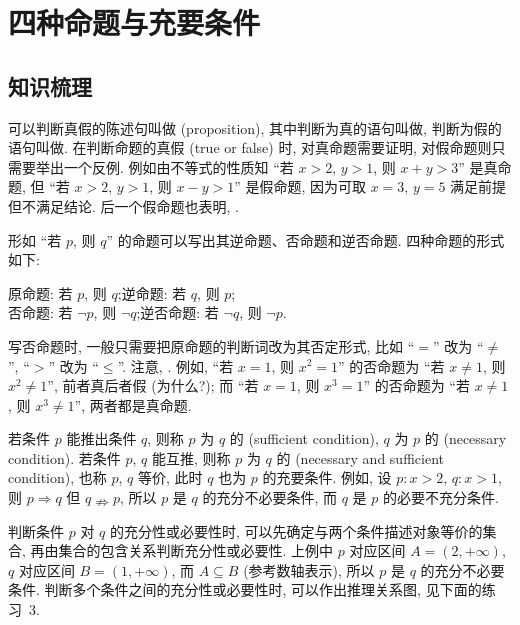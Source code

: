   \section{四种命题与充要条件}

  \subsection{知识梳理}
  可以判断真假的陈述句叫做 (proposition), 
  其中判断为真的语句叫做, 判断为假的语句叫做.
  在判断命题的真假 (true or false) 时, 对真命题需要证明, 对假命题则只需要举出一个反例. 
  例如由不等式的性质知 ``若 $x>2$, $y>1$, 则 $x+y>3$'' 是真命题, 
  但 ``若 $x>2$, $y>1$, 则 $x-y>1$'' 是假命题, 
  因为可取 $x=3$, $y=5$ 满足前提但不满足结论. 后一个假命题也表明, .
  
  形如 ``若 $p$, 则 $q$'' 的命题可以写出其逆命题、否命题和逆否命题. 四种命题的形式如下:
  \begin{center}
    原命题: 若 $p$, 则 $q$;\quad 逆命题: 若 $q$, 则 $p$;\\
    否命题: 若 $\neg p$, 则 $\neg q$;\quad 逆否命题: 若 $\neg q$, 则 $\neg p$.
  \end{center}
  写否命题时, 一般只需要把原命题的判断词改为其否定形式, 比如 ``$=$'' 改为 ``$\neq$'', ``$>$'' 改为 ``$\leqslant$''.   注意, .
  例如, ``若 $x=1$, 则 $x^2=1$'' 的否命题为 ``若 $x\neq 1$, 则 $x^2\neq 1$'', 前者真后者假 (为什么?); 而 ``若 $x=1$, 则 $x^3=1$'' 的否命题为 ``若 $x\neq 1$, 则 $x^3\neq 1$'', 两者都是真命题. 

  
  若条件 $p$ 能推出条件 $q$, 则称 $p$ 为 $q$ 的 
  (sufficient condition), $q$ 为 $p$ 的 (necessary condition). 
  若条件 $p$, $q$ 能互推, 则称 $p$ 为 $q$ 的 (necessary and sufficient condition), 也称 $p$, $q$ 等价, 此时 $q$ 也为 $p$ 的充要条件.
  例如, 设 $p\colon x>2$, $q\colon x>1$, 则 $p\Rightarrow q$ 但 $q\nRightarrow p$, 所以 $p$ 是 $q$ 的充分不必要条件, 而 $q$ 是 $p$ 的必要不充分条件. 
  
  判断条件 $p$ 对 $q$ 的充分性或必要性时, 可以先确定与两个条件描述对象等价的集合, 
  再由集合的包含关系判断充分性或必要性. 上例中 $p$ 对应区间 $A=(2,+\infty)$, 
  $q$ 对应区间 $B=(1,+\infty)$, 而 $A\subseteq B$ (参考数轴表示),
  所以 $p$ 是 $q$ 的充分不必要条件. 
  判断多个条件之间的充分性或必要性时, 可以作出推理关系图, 见下面的练习~3.
    
